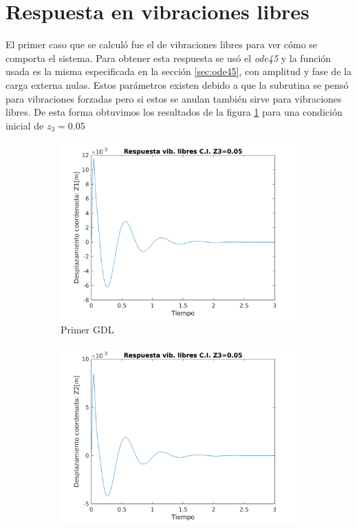 \documentclass[oneside, a4paper, spanish, links]{amca}
\begin{document}
\newpage
\section{Respuesta en vibraciones libres}
\label{sec:vib lib}

El primer caso que se calculó fue el de vibraciones libres para ver cómo se comporta el sistema. Para obtener esta respuesta se usó el \textit{ode45} y la función usada es la misma especificada en la sección \ref{sec:ode45}, con amplitud y fase de la carga externa nulas. Estos parámetros existen debido a que la subrutina se pensó para vibraciones forzadas pero si estos se anulan también sirve para vibraciones libres. De esta forma obtuvimos los resultados de la figura \ref{sec:vib lib} para una condición inicial de $z_3 = 0.05$

\begin{figure}[h]
    \centering
    \begin{subfigure}[b]{0.475\textwidth}
        \centering
        \includegraphics[width=\textwidth]{respvibZ1.png}
        \caption[]%
        {{\small Primer GDL}}    
    \end{subfigure}
    \hfill
    \begin{subfigure}[b]{0.475\textwidth}  
        \centering 
        \includegraphics[width=\textwidth]{respvibZ2.png}

\end{subfigure}
\end{figure}
\end{document}
